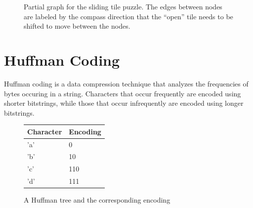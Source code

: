 \documentclass{pset}
\begin{document}
\begin{figure}
\begin{center}
\begin{tikzpicture}


\end{tikzpicture}
\end{center}
\caption{Partial graph for the sliding tile puzzle. The edges between
  nodes are labeled by the compass direction that the ``open'' tile
  needs to be shifted to move between the nodes.}
\label{fig:state-space}
\end{figure}

\newpage{}

\part{Huffman Coding}

Huffman coding is a data compression technique that analyzes the
frequencies of bytes occuring in a string. Characters that occur
frequently are encoded using shorter bitstrings, while those that
occur infrequently are encoded using longer bitstrings.

\begin{figure}
\hfill
{}
\hfill
\begin{tabular}[t]{ll}
Character & Encoding \\ \hline
'a' & 0 \\
'b' & 10 \\
'c' & 110 \\
'd' & 111 \\
\end{tabular}
\hfill{}

\caption{A Huffman tree and the corresponding encoding}
\label{fig:hufftree}
\end{figure}
\end{document}
